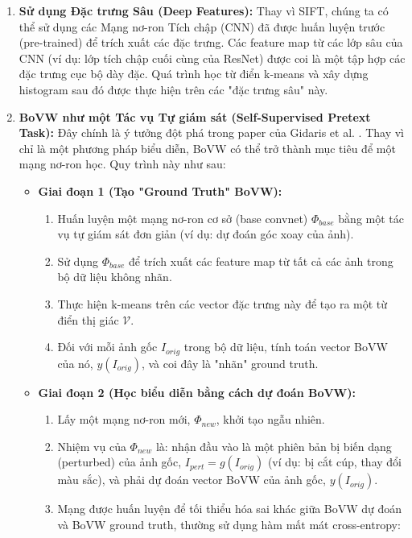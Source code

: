 \begin{enumerate}
    \item \textbf{Sử dụng Đặc trưng Sâu (Deep Features):} Thay vì SIFT, chúng ta có thể sử dụng các Mạng nơ-ron Tích chập (CNN) đã được huấn luyện trước (pre-trained) để trích xuất các đặc trưng. Các feature map từ các lớp sâu của CNN (ví dụ: lớp tích chập cuối cùng của ResNet) được coi là một tập hợp các đặc trưng cục bộ dày đặc. Quá trình học từ điển k-means và xây dựng histogram sau đó được thực hiện trên các "đặc trưng sâu" này.
    
    \item \textbf{BoVW như một Tác vụ Tự giám sát (Self-Supervised Pretext Task):} Đây chính là ý tưởng đột phá trong paper của Gidaris et al. \cite{Gidaris2020}. Thay vì chỉ là một phương pháp biểu diễn, BoVW có thể trở thành mục tiêu để một mạng nơ-ron học. Quy trình này như sau:
    \begin{itemize}
        \item \textbf{Giai đoạn 1 (Tạo "Ground Truth" BoVW):}
            \begin{enumerate}
                \item Huấn luyện một mạng nơ-ron cơ sở (base convnet) $\Phi_{base}$ bằng một tác vụ tự giám sát đơn giản (ví dụ: dự đoán góc xoay của ảnh).
                \item Sử dụng $\Phi_{base}$ để trích xuất các feature map từ tất cả các ảnh trong bộ dữ liệu không nhãn.
                \item Thực hiện k-means trên các vector đặc trưng này để tạo ra một từ điển thị giác $\mathcal{V}$.
                \item Đối với mỗi ảnh gốc $I_{orig}$ trong bộ dữ liệu, tính toán vector BoVW của nó, $y(I_{orig})$, và coi đây là "nhãn" ground truth.
            \end{enumerate}
        \item \textbf{Giai đoạn 2 (Học biểu diễn bằng cách dự đoán BoVW):}
            \begin{enumerate}
                \item Lấy một mạng nơ-ron mới, $\Phi_{new}$, khởi tạo ngẫu nhiên.
                \item Nhiệm vụ của $\Phi_{new}$ là: nhận đầu vào là một phiên bản bị biến dạng (perturbed) của ảnh gốc, $I_{pert} = g(I_{orig})$ (ví dụ: bị cắt cúp, thay đổi màu sắc), và phải dự đoán vector BoVW của ảnh gốc, $y(I_{orig})$.
                \item Mạng được huấn luyện để tối thiểu hóa sai khác giữa BoVW dự đoán và BoVW ground truth, thường sử dụng hàm mất mát cross-entropy:

\end{enumerate}
\end{itemize}
\end{enumerate}
